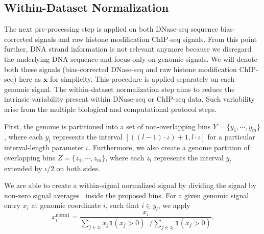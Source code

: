 \subsection{Within-Dataset Normalization}
\label{sec:withindataset.normalization}

The next pre-processing step is applied on both DNase-seq sequence bias-corrected signals and raw histone modification ChIP-seq signals. From this point further, DNA strand information is not relevant anymore because we disregard the underlying DNA sequence and focus only on genomic signals. We will denote both these signals (bias-corrected DNase-seq and raw histone modification ChIP-seq) here as $\mathbf{x}$ for simplicity. This procedure is applied separately on each genomic signal. The within-dataset normalization step aims to reduce the intrinsic variability present within DNase-seq or ChIP-seq data. Such variability arise from the multiple biological and computational protocol steps.

First, the genome is partitioned into a set of non-overlapping bins ${Y} = \{ {y}_{1}, \cdots, {y}_{m} \}$, where each ${y}_{l}$ represents the interval $[((l-1) \cdot \iota )+1, l \cdot \iota]$ for a particular interval-length parameter $\iota$. Furthermore, we also create a genome partition of overlapping bins ${Z} = \{ {z}_{1}, \cdots, {z}_{m} \}$, where each ${z}_{l}$ represents the interval ${y}_{l}$ extended by $\iota/2$ on both sides.

We are able to create a within-signal normalized signal by dividing the signal by non-zero signal averages~\cite{boyle2011} inside the proposed bins. For a given genomic signal entry $x_i$ at genomic coordinate $i$, such that $i \in {y}_{l}$, we apply
\begin{equation}
  \label{eq:signal.within.norm}
  {x}^{\text{norm1}}_{i} = \frac{{x}_{i}}{ 
                     \sum\limits_{j \in {z}_{l}} {x}_{j} \mathbf{1}({x}_{j} > 0)  \;\; \Big/  
                     \sum\limits_{j \in {z}_{l}} \mathbf{1}({x}_{j} > 0)
                     }.
\end{equation}

